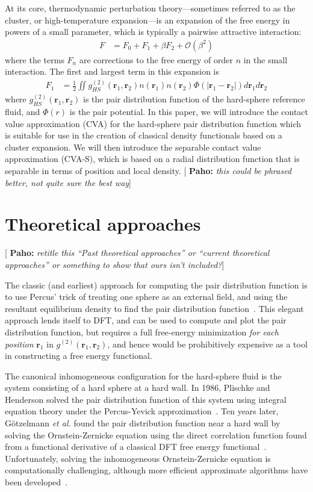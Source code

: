 \documentclass[letterpaper,twocolumn,amsmath,amssymb,pre,aps,10pt]{revtex4-1}
\newcommand{\green}[1]{{\bf \color{green} #1}}
\newcommand{\rr}{\textbf{r}}
\newcommand{\pahosays}[1]{{\color{red} [\green{Paho:} \emph{#1}]}}
\begin{document}
At its core, thermodynamic perturbation theory---sometimes referred to
as the cluster, or high-temperature expansion---is an expansion of the
free energy in powers of a small parameter, which is typically a
pairwise attractive interaction:
\begin{align}
  F &= F_0 + F_1 + \beta F_2 + \mathcal{O}(\beta^2)
\end{align}
where the terms $F_n$ are corrections to the free energy of order $n$
in the small interaction.  The first and largest term in this
expansion is
\begin{align}
  F_1 &= \tfrac12 \iint
  g^{(2)}_{HS}(\rr_1,\rr_2)n(\rr_1)n(\rr_2)\Phi(|\rr_1-\rr_2|)
  d\rr_1d\rr_2
  \label{eq:mean-field}
\end{align}
where $g^{(2)}_{HS}(\rr_1,\rr_2)$ is the pair distribution function of
the hard-sphere reference fluid, and $\Phi(r)$ is the pair potential.
In this paper, we will introduce the contact value approximation (CVA)
for the hard-sphere pair distribution function which is suitable for
use in the creation of classical density functionals based on a
cluster expansion. We will then introduce the separable contact value
approximation (CVA-S), which is based on a radial distribution
function that is separable in terms of position and local
density.\pahosays{this could be phrased better, not quite sure the
  best way}

\section{Theoretical approaches}
\pahosays{retitle this ``Past theoretical approaches'' or ``current
  theoretical approaches'' or something to show that ours isn't
  included?}

The classic (and earliest) approach for computing the pair
distribution function is to use Percus' trick of treating one sphere
as an external field, and using the resultant equilibrium density to
find the pair distribution function~\cite{hansen2006theory}.  This
elegant approach lends itself to DFT, and can be used to compute and
plot the pair distribution function, but requires a full free-energy
minimization \emph{for each position} $\rr_1$ in
$g^{(2)}(\rr_1,\rr_2)$, and hence would be prohibitively expensive as
a tool in constructing a free energy functional.

The canonical inhomogeneous configuration for the hard-sphere fluid is
the system consisting of a hard sphere at a hard wall.  In 1986,
Plischke and Henderson solved the pair distribution function of this
system using integral equation theory under the Percus-Yevick
approximation~\cite{plischke1986pair}.  Ten years later,
G{\"o}tzelmann \emph{et al.} found the pair distribution function near
a hard wall by solving the Ornstein-Zernicke equation using the direct
correlation function found from a functional derivative of a classical
DFT free energy functional~\cite{gotzelmann1996structure}.
Unfortunately, solving the inhomogeneous Ornstein-Zernicke equation is
computationally challenging, although more efficient approximate
algorithms have been developed~\cite{paul2003variational}.
\end{document}
